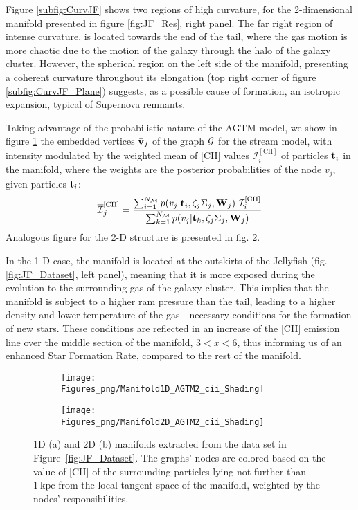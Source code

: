 Figure \ref{subfig:CurvJF} shows two regions of high curvature, for the 2-dimensional manifold presented in figure \ref{fig:JF_Res}, right panel.
The far right region of intense curvature, is located towards the end of the tail, where the gas motion is more chaotic due to the motion of the galaxy through the halo of the galaxy cluster. However, the spherical region on the left side of the manifold, presenting a coherent curvature throughout its elongation (top right corner of figure \ref{subfig:CurvJF_Plane}) suggests, as a possible cause of formation, an isotropic expansion, typical of Supernova remnants.

Taking advantage of the probabilistic nature of the AGTM model, we show in figure \ref{subfig:1dManGraph} the embedded vertices
$\bar{\boldsymbol{\mathbf{v}}}_j$ of the graph $\bar{\cal G}$
for the stream model, with intensity modulated by the weighted mean of [CII] values $\mathcal{I}^{\mathrm{[CII]}}_i$ of particles $\boldsymbol{\mathbf{t}}_i$ in the manifold, where the weights are the posterior probabilities of the node $v_j$, given  particles $\boldsymbol{\mathbf{t}}_i$:
\begin{equation}\label{eq:WeightedVar}
    \overline{\mathcal{I}}^{\mathrm{[CII]}}_j = \frac{\sum_{i=1}^{N_{\mathcal{M}}} p(v_j | \boldsymbol{\mathbf{t}}_i,\zeta_j\Sigma_j,\boldsymbol{\mathbf{W}}_j) ~ \mathcal{I}^{\mathrm{[CII]}}_i}{\sum_{k=1}^{N_{\mathcal{M}}} p(v_j | \boldsymbol{\mathbf{t}}_k,\zeta_j\Sigma_j,\boldsymbol{\mathbf{W}}_j)}
\end{equation}
Analogous figure for the 2-D structure is presented in fig. \ref{subfig:2dManGraph}.

In the 1-D case, the manifold is located at the outskirts of the Jellyfish (fig. \ref{fig:JF_Dataset}, left panel), meaning that it is more exposed during the evolution to the surrounding gas of the galaxy cluster. This implies that the manifold is subject to a higher ram pressure than the tail, leading to a higher density and lower temperature of the gas - necessary conditions for the formation of new stars. These conditions are reflected in an increase of the [CII] emission line over the middle section of the manifold, $3 < x < 6$, thus informing us of an enhanced Star Formation Rate, compared to the rest of the manifold.
\begin{figure}[ht]
\centering
\begin{subfigure}[t]{0.48\textwidth}
 \caption{}
 \label{subfig:1dManGraph}
 \texttt{[image: Figures\_png/Manifold1D\_AGTM2\_cii\_Shading]}
\end{subfigure}
\begin{subfigure}[t]{0.49\textwidth}
 \caption{}
 \label{subfig:2dManGraph}
 \texttt{[image: Figures\_png/Manifold2D\_AGTM2\_cii\_Shading]}
\end{subfigure}
\caption{1D (a) and 2D (b) manifolds extracted from the data set in Figure~\ref{fig:JF_Dataset}.
The graphs' nodes are colored based on the value of [CII] of the surrounding particles lying not further than $\mathrm{1~kpc}$ from the local tangent space of the manifold, weighted by the nodes' responsibilities.}
\label{fig:Man2D}
\end{figure}

